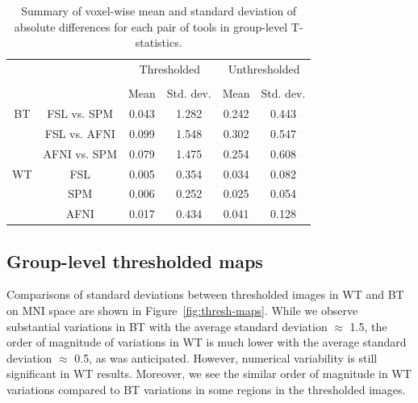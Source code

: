 \documentclass[conference]{IEEEtran}
\begin{document}
\setlength{\tabcolsep}{7pt}
\begin{table}[h]
    \centering
    \begin{tabular}{cccc|cc}
        \toprule
        \multirow{2}{*}{}& {} & \multicolumn{2}{c}{Thresholded} & \multicolumn{2}{c}{Unthresholded} \\
        \cmidrule{3-4} \cmidrule{5-6} \\
        {} & {} & Mean & Std. dev. & Mean & Std. dev. \\
        \midrule
        \rowcolor{lightgray}
        {BT} & FSL vs. SPM        &  0.043       & 1.282      & 0.242     & 0.443  \\
        \rowcolor{lightgray}
        {} & FSL vs. AFNI         &  0.099       & 1.548      & 0.302     & 0.547  \\
        \rowcolor{lightgray}
        {} & AFNI vs. SPM         &  0.079       & 1.475      & 0.254     & 0.608  \\
        {WT} & FSL    &  0.005       & 0.354      & 0.034     & 0.082  \\
        {}   & SPM    &  0.006       & 0.252      & 0.025     & 0.054  \\
        {}   & AFNI   &  0.017       & 0.434      & 0.041     & 0.128  \\
        \bottomrule
    \end{tabular}
    \caption{Summary of voxel-wise mean and standard deviation of absolute differences for each pair of tools
    in group-level T-statistics.}
    \label{table:pipeline-stats}
\end{table}


\subsection{Group-level thresholded maps}

Comparisons of standard deviations between thresholded images in WT and BT
on MNI space are shown in Figure~\ref{fig:thresh-maps}.
While we observe substantial variations in BT with the average standard deviation $\approx$ 1.5,
the order of magnitude of variations in WT is much lower with the average standard deviation $\approx$ 0.5,
as was anticipated. However, numerical variability is still significant in WT results.
Moreover, we see the similar order of magnitude in WT variations compared to BT variations
in some regions in the thresholded images.
\end{document}
